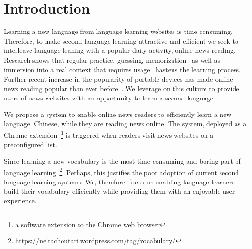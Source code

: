 \section{Introduction}
Learning a new language from language learning websites is 
time consuming. Therefore, to make second language learning 
attractive and efficient we seek to interleave language leaning 
with a popular daily activity, online news reading. Research shows 
that regular practice, guessing, memorization~\cite{rubin91} as well 
as immersion into a real context that requires usage~\cite{naiman78} hastens 
the learning process. Further recent increase in the popularity of 
portable devices has made online news reading popular than ever 
before~\cite{yarlh2012}. We leverage on this culture to provide 
users of news websites with an opportunity to learn a second 
language.

We propose a system to enable online news readers to efficiently learn 
a new language, Chinese, while they are reading news online. The system, deployed 
as a Chrome extension~\footnote{a software extension to the Chrome web browser}  
is triggered when readers visit news websites on a preconfigured list.

Since learning a new vocabulary is the most time consuming and boring part of 
language learning~\footnote{\url{https://neltachoutari.wordpress.com/tag/vocabulary/}}. 
Perhaps, this justifies the poor adoption of current second language learning 
systems. We, therefore, focus on enabling language learners build their vocabulary 
efficiently while providing them with an enjoyable user experience.

